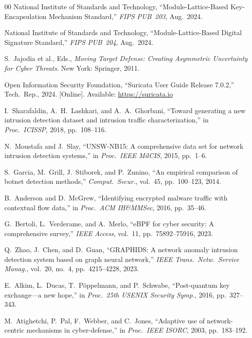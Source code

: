 \documentclass[journal]{IEEEtran}
\renewcommand{\_}{\textunderscore\allowbreak}
\begin{document}
\begin{thebibliography}{00}
National Institute of Standards and Technology, ``Module-Lattice-Based
Key-Encapsulation Mechanism Standard,'' \emph{FIPS PUB~203}, Aug.~2024.

National Institute of Standards and Technology, ``Module-Lattice-Based Digital
Signature Standard,'' \emph{FIPS PUB~204}, Aug.~2024.

S.~Jajodia et al., Eds., \emph{Moving Target Defense: Creating Asymmetric
Uncertainty for Cyber Threats}. New York: Springer, 2011.

Open Information Security Foundation, ``Suricata User Guide Release 7.0.2,''
Tech.\ Rep., 2024. [Online]. Available: \url{https://suricata.io}

I.~Sharafaldin, A.~H.~Lashkari, and A.~A.~Ghorbani, ``Toward generating a new
intrusion detection dataset and intrusion traffic characterization,''
in \emph{Proc.\ ICISSP}, 2018, pp.~108--116.

N.~Moustafa and J.~Slay, ``UNSW-NB15: A comprehensive data set for network
intrusion detection systems,'' in \emph{Proc.\ IEEE MilCIS}, 2015, pp.~1--6.

S.~Garcia, M.~Grill, J.~Stiborek, and P.~Zunino, ``An empirical comparison of
botnet detection methods,'' \emph{Comput.\ Secur.}, vol.~45, pp.~100--123, 2014.

B.~Anderson and D.~McGrew, ``Identifying encrypted malware traffic with contextual
flow data,'' in \emph{Proc.\ ACM IH\&MMSec}, 2016, pp.~35--46.

G.~Bertoli, L.~Verderame, and A.~Merlo, ``eBPF for cyber security: A comprehensive
survey,'' \emph{IEEE Access}, vol.~11, pp.~75892--75916, 2023.

Q.~Zhao, J.~Chen, and D.~Guan, ``GRAPHIDS: A network anomaly intrusion detection
system based on graph neural network,'' \emph{IEEE Trans.\ Netw.\ Service Manag.},
vol.~20, no.~4, pp.~4215--4228, 2023.

E.~Alkim, L.~Ducas, T.~P{\"o}ppelmann, and P.~Schwabe, ``Post-quantum key
exchange---a new hope,'' in \emph{Proc.\ 25th USENIX Security Symp.}, 2016,
pp.~327--343.

M.~Atighetchi, P.~Pal, F.~Webber, and C.~Jones, ``Adaptive use of network-centric
mechanisms in cyber-defense,'' in \emph{Proc.\ IEEE ISORC}, 2003, pp.~183--192.


\end{thebibliography}
\end{document}

